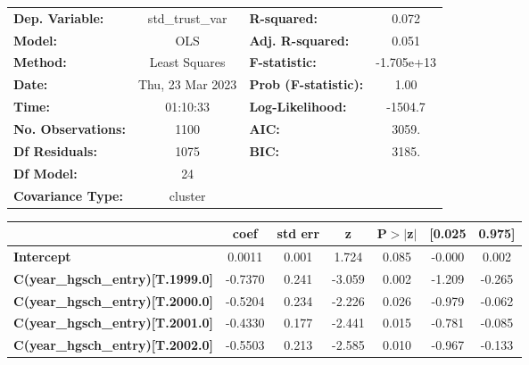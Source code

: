 \begin{center}
\begin{tabular}{lclc}
\toprule
\textbf{Dep. Variable:}                  & std\_trust\_var  & \textbf{  R-squared:         } &     0.072   \\
\textbf{Model:}                          &       OLS        & \textbf{  Adj. R-squared:    } &     0.051   \\
\textbf{Method:}                         &  Least Squares   & \textbf{  F-statistic:       } & -1.705e+13  \\
\textbf{Date:}                           & Thu, 23 Mar 2023 & \textbf{  Prob (F-statistic):} &     1.00    \\
\textbf{Time:}                           &     01:10:33     & \textbf{  Log-Likelihood:    } &   -1504.7   \\
\textbf{No. Observations:}               &        1100      & \textbf{  AIC:               } &     3059.   \\
\textbf{Df Residuals:}                   &        1075      & \textbf{  BIC:               } &     3185.   \\
\textbf{Df Model:}                       &          24      & \textbf{                     } &             \\
\textbf{Covariance Type:}                &     cluster      & \textbf{                     } &             \\
\bottomrule
\end{tabular}
\begin{tabular}{lcccccc}
                                         & \textbf{coef} & \textbf{std err} & \textbf{z} & \textbf{P$> |$z$|$} & \textbf{[0.025} & \textbf{0.975]}  \\
\midrule
\textbf{Intercept}                       &       0.0011  &        0.001     &     1.724  &         0.085        &       -0.000    &        0.002     \\
\textbf{C(year\_hgsch\_entry)[T.1999.0]} &      -0.7370  &        0.241     &    -3.059  &         0.002        &       -1.209    &       -0.265     \\
\textbf{C(year\_hgsch\_entry)[T.2000.0]} &      -0.5204  &        0.234     &    -2.226  &         0.026        &       -0.979    &       -0.062     \\
\textbf{C(year\_hgsch\_entry)[T.2001.0]} &      -0.4330  &        0.177     &    -2.441  &         0.015        &       -0.781    &       -0.085     \\
\textbf{C(year\_hgsch\_entry)[T.2002.0]} &      -0.5503  &        0.213     &    -2.585  &         0.010        &       -0.967    &       -0.133     \\

\end{tabular}
\end{center}
